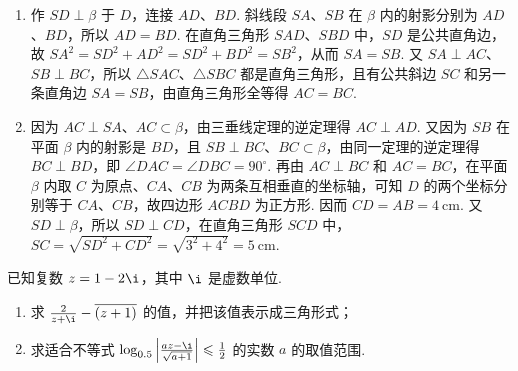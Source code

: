 \documentclass[UTF8,a4paper,oneside,11pt]{ctexbook}
\begin{document}
\begin{solution}
\begin{enumerate}
\item 作 \(SD\perp\beta\) 于 \(D\)，连接 \(AD\)、\(BD\). 斜线段 \(SA\)、\(SB\) 在 \(\beta\) 内的射影分别为 \(AD\)、\(BD\)，所以 \(AD=BD\). 在直角三角形 \(SAD\)、\(SBD\) 中，\(SD\) 是公共直角边，故 \(SA^2=SD^2+AD^2=SD^2+BD^2=SB^2\)，从而 \(SA=SB\). 又 \(SA\perp AC\)、\(SB\perp BC\)，所以 \(\triangle SAC\)、\(\triangle SBC\) 都是直角三角形，且有公共斜边 \(SC\) 和另一条直角边 \(SA=SB\)，由直角三角形全等得 \(AC=BC\).
\item 因为 \(AC\perp SA\)、\(AC\subset\beta\)，由三垂线定理的逆定理得 \(AC\perp AD\). 又因为 \(SB\) 在平面 \(\beta\) 内的射影是 \(BD\)，且 \(SB\perp BC\)、\(BC\subset\beta\)，由同一定理的逆定理得 \(BC\perp BD\)，即 \(\angle DAC=\angle DBC=90^\circ\). 再由 \(AC\perp BC\) 和 \(AC=BC\)，在平面 \(\beta\) 内取 \(C\) 为原点、\(CA\)、\(CB\) 为两条互相垂直的坐标轴，可知 \(D\) 的两个坐标分别等于 \(CA\)、\(CB\)，故四边形 \(ACBD\) 为正方形. 因而 \(CD=AB=4\mathrm{~cm}\). 又 \(SD\perp\beta\)，所以 \(SD\perp CD\)，在直角三角形 \(SCD\) 中，\(SC=\sqrt{SD^2+CD^2}=\sqrt{3^2+4^2}=5\mathrm{~cm}\).
\end{enumerate}

\end{solution}

\begin{problem}

已知复数 \(z = 1 - 2\i\)，其中 \(\i\) 是虚数单位.

\begin{enumerate}
\item 求 \(\frac{2}{z + \i} - \overline{(z + 1)}\) 的值，并把该值表示成三角形式；
\item 求适合不等式 \(\log_{0.5}\left|\frac{az - \i}{\sqrt{a + 1}}\right| \leqslant \frac{1}{2}\) 的实数 \(a\) 的取值范围.
\end{enumerate}
\end{problem}
\end{document}
